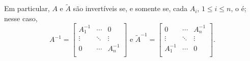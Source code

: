 \documentclass[leqno]{article}
\begin{document}
\begin{proposition}
	\noindent Em particular, $A$ e $\tilde A$ são invertíveis se, e somente se, cada $A_{i}$, $1 \le i \le n$, o é; nesse caso, 
	\begin{equation*} 
		A^{-1} = 
		\begin{bmatrix} 
			A_{1}^{-1} & \cdots & 0 \\ 
			\vdots & \ddots & \vdots \\ 
			0 & \cdots & A_{n}^{-1} \\ 
		\end{bmatrix} 
		\text{ e } 
		\tilde A^{-1} = 
		\begin{bmatrix} 
			0 & \cdots & A_{n}^{-1} \\ 
			\vdots & \ddots & \vdots \\ 
			A_{1}^{-1} & \cdots & 0 \\ 
		\end{bmatrix}. 
	\end{equation*} 
\end{proposition} 
\end{document}
